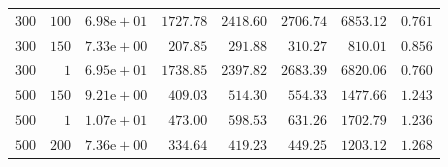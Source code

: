 \begin{table}
{\begin{tabular}{rrlrrrrr}
    $300$ & $100$ & $6.98\text{e}+01$ & $1727.78$ & $2418.60$ & $2706.74$ & $6853.12$ & $0.761$ \\
    $300$ & $150$ & $7.33\text{e}+00$ & $207.85$ & $291.88$ & $310.27$ & $810.01$ & $0.856$ \\
    $300$ & $1$ & $6.95\text{e}+01$ & $1738.85$ & $2397.82$ & $2683.39$ & $6820.06$ & $0.760$ \\
    $500$ & $150$ & $9.21\text{e}+00$ & $409.03$ & $514.30$ & $554.33$ & $1477.66$ & $1.243$ \\
    $500$ & $1$ & $1.07\text{e}+01$ & $473.00$ & $598.53$ & $631.26$ & $1702.79$ & $1.236$ \\
    $500$ & $200$ & $7.36\text{e}+00$ & $334.64$ & $419.23$ & $449.25$ & $1203.12$ & $1.268$ \\


\end{tabular}}
\end{table}
